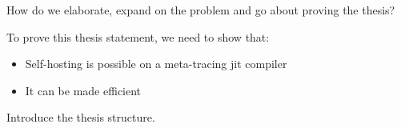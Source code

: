     \begin{mainpoint}
        How do we elaborate, expand on the problem and go about proving the thesis?

        To prove this thesis statement, we need to show that:
        \begin{itemize}
            \item Self-hosting is possible on a meta-tracing \gls{jit} compiler
            \item It can be made efficient
        \end{itemize}

        Introduce the thesis structure.
    \end{mainpoint}









